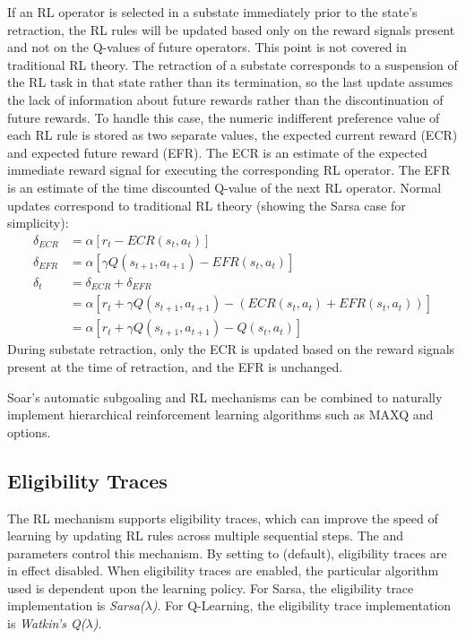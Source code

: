 If an RL operator is selected in a substate immediately prior to the state's retraction, the RL rules will be updated based only on the reward signals present and not on the Q-values of future operators.
This point is not covered in traditional RL theory.
The retraction of a substate corresponds to a suspension of the RL task in that state rather than its termination, so the last update assumes the lack of information about future rewards rather than the discontinuation of future rewards.
To handle this case, the numeric indifferent preference value of each RL rule is stored as two separate values, the expected current reward (ECR) and expected future reward (EFR).
The ECR is an estimate of the expected immediate reward signal for executing the corresponding RL operator.
The EFR is an estimate of the time discounted Q-value of the next RL operator.
Normal updates correspond to traditional RL theory (showing the Sarsa case for simplicity):
\begin{align*}
\delta_{ECR} &= \alpha \left[ r_t - ECR(s_t, a_t) \right] \\
\delta_{EFR} &= \alpha \left[ \gamma Q(s_{t+1}, a_{t+1}) - EFR(s_t, a_t) \right] \\
\delta_t &= \delta_{ECR} + \delta_{EFR} \\
&= \alpha \left[ r_t + \gamma Q(s_{t+1}, a_{t+1}) - \left( ECR(s_t, a_t) + EFR(s_t, a_t) \right) \right] \\
&= \alpha \left[ r_t + \gamma Q(s_{t+1}, a_{t+1}) - Q(s_t, a_t) \right]
\end{align*}
During substate retraction, only the ECR is updated based on the reward signals present at the time of retraction, and the EFR is unchanged.

Soar's automatic subgoaling and RL mechanisms can be combined to naturally implement hierarchical reinforcement learning algorithms such as MAXQ and options.

\subsection{Eligibility Traces}
\label{RL-et}
The RL mechanism supports eligibility traces, which can improve the speed of learning by updating RL rules across multiple sequential steps.
The  and  parameters control this mechanism.
By setting  to  (default), eligibility traces are in effect disabled.
When eligibility traces are enabled, the particular algorithm used is dependent upon the learning policy.
For Sarsa, the eligibility trace implementation is \emph{Sarsa($\lambda$)}. 
For Q-Learning, the eligibility trace implementation is \emph{Watkin's Q($\lambda$)}.

